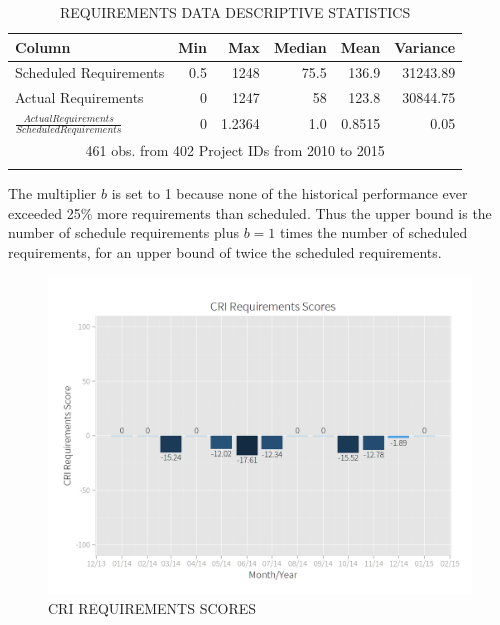 \documentclass[SDSUThesis.tex]{subfiles}
\begin{document}
        \begin{longtable}{@{}l rr rrr}
            \toprule%
             \centering%
             {\bfseries Column}
             & {\bfseries Min}
             & {\bfseries Max}
             & {\bfseries Median}
             & {\bfseries Mean}
             & {\bfseries Variance} \\
            
            \cmidrule[0.2pt](r{0.125em}){1-1}%
            \cmidrule[0.2pt](lr{0.125em}){2-2}%
            \cmidrule[0.2pt](l{0.125em}){3-3}%
            \cmidrule[0.2pt](l{0.125em}){4-4}%
            \cmidrule[0.2pt](l{0.125em}){5-5}%
            \endhead
            
            Scheduled Requirements & 0.5 & 1248 & 75.5 & 136.9 & 31243.89 \\
            \myrowcolour%
            Actual Requirements & 0 & 1247 & 58 & 123.8 & 30844.75 \\
            $\frac{Actual Requirements}{Scheduled Requirements}$ & 0 & 1.2364 & 1.0 & 0.8515 & 0.05 \\
            
            \bottomrule
            
            \multicolumn{6}{c}{461 obs. from 402 Project IDs from 2010 to 2015} \\
            
            \caption{REQUIREMENTS DATA DESCRIPTIVE STATISTICS}
            \label{tab:requirements_desc}
        \end{longtable}
        
        The multiplier $b$ is set to 1 because none of the historical performance
        ever exceeded 25\% more requirements than scheduled. Thus the upper
        bound is the number of schedule requirements plus $b=1$ times
        the number of scheduled requirements, for an upper bound of twice
        the scheduled requirements.
        
        \begin{figure}[htb]
            \centering
            \includegraphics[scale=.3]{images/requirements_scores.png}
            \caption{CRI REQUIREMENTS SCORES}
            \label{fig:requirements-scores}
        \end{figure}
        
\end{document}
